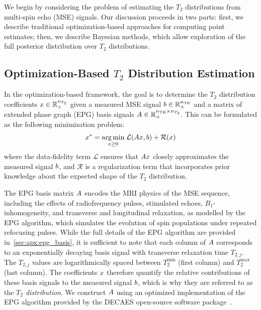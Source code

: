 We begin by considering the problem of estimating the $T_2$ distributions from multi-spin echo (\gls*{MSE}) signals.
Our discussion proceeds in two parts: first, we describe traditional optimization-based approaches for computing point estimates;
then, we describe Bayesian methods, which allow exploration of the full posterior distribution over $T_2$ distributions.

\subsection{Optimization-Based \texorpdfstring{$T_2$}{T2} Distribution Estimation}\label{subsec:optimization_t2}

In the optimization-based framework, the goal is to determine the $T_2$ distribution coefficients $x \in \mathbb{R}_+^{n_{T_2}}$ given a measured \gls*{MSE} signal $b \in \mathbb{R}_+^{n_{\mathrm{TE}}}$ and a matrix of extended phase graph (\gls*{EPG}) basis signals $A \in \mathbb{R}_+^{n_{\mathrm{TE}} \times n_{T_2}}$.
This can be formulated as the following minimization problem:
\begin{align}\label{eqn:t2dist_general}
    x^* = \underset{x \ge 0}{\operatorname{arg\,min}} \; \mathcal{L}(A x, b) + \mathcal{R}(x)
\end{align}
where the data-fidelity term $\mathcal{L}$ ensures that $A x$ closely approximates the measured signal $b$, and $\mathcal{R}$ is a regularization term that incorporates prior knowledge about the expected shape of the $T_2$ distribution.

The \gls*{EPG} basis matrix $A$ encodes the \gls*{MRI} physics of the \gls*{MSE} sequence, including the effects of radiofrequency pulses, stimulated echoes, $B_1$-inhomogeneity, and transverse and longitudinal relaxation, as modelled by the \gls*{EPG} algorithm, which simulates the evolution of spin populations under repeated refocusing pulses.
While the full details of the \gls*{EPG} algorithm are provided in~\cref{sec:apx:epg_basis}, it is sufficient to note that each column of $A$ corresponds to an exponentially decaying basis signal with transverse relaxation time $T_{2,j}$.
The $T_{2,j}$ values are logarithmically spaced between $T_2^{\min}$ (first column) and $T_2^{\max}$ (last column).
The coefficients $x$ therefore quantify the relative contributions of these basis signals to the measured signal $b$, which is why they are referred to as the \textit{$T_2$ distribution}.
We construct $A$ using an optimized implementation of the \gls*{EPG} algorithm provided by the \gls*{DECAES} open-source software package~\citep{doucette_decaes_2020}.

